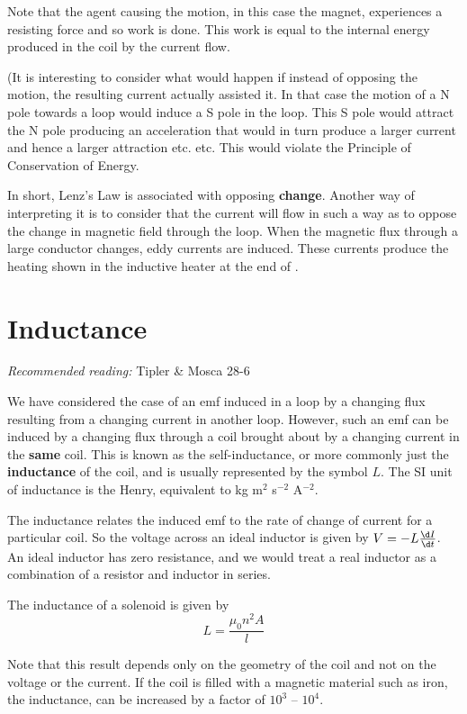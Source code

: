 \documentclass[
]{book}
\begin{document}
Note that the agent causing the motion, in this case the magnet,
experiences a resisting force and so work is done. This work is equal to
the internal energy produced in the coil by the current flow.

(It is interesting to consider what would happen if instead of opposing
the motion, the resulting current actually assisted it. In that case the
motion of a N pole towards a loop would induce a S pole in the loop.
This S pole would attract the N pole producing an acceleration that
would in turn produce a larger current and hence a larger attraction
etc. etc. This would violate the Principle of Conservation of Energy.

In short, Lenz's Law is associated with opposing \textbf{change}. Another way
of interpreting it is to consider that the current will flow in such a
way as to oppose the change in magnetic field through the loop. When the
magnetic flux through a large conductor changes, eddy currents are
induced. These currents produce the heating shown in the inductive
heater at the end of .

\hypertarget{inductance}{%
\section{Inductance}\label{inductance}}

\emph{Recommended reading:} Tipler \& Mosca 28-6

We have considered the case of an emf induced in a loop by a changing
flux resulting from a changing current in another loop. However, such an
emf can be induced by a changing flux through a coil brought about by a
changing current in the \textbf{same} coil. This is known as the
self-inductance, or more commonly just the \textbf{inductance} of the coil,
and is usually represented by the symbol \(L\). The SI unit of inductance
is the Henry, equivalent to kg m\(^2\) s\(^{-2}\) A\(^{-2}\).

The inductance relates the induced emf to the rate of change of current
for a particular coil. So the voltage across an ideal inductor is given
by \(V = -L \frac{\d I}{\d t}\). An ideal inductor has zero resistance,
and we would treat a real inductor as a combination of a resistor and
inductor in series.

The inductance of a solenoid is given by \[L = \frac{\mu_0 n^2 A}{l}\]

Note that this result depends only on the geometry of the coil and not
on the voltage or the current. If the coil is filled with a magnetic
material such as iron, the inductance, can be increased by a factor of
\(10^3\) -- \(10^4\).
\end{document}
